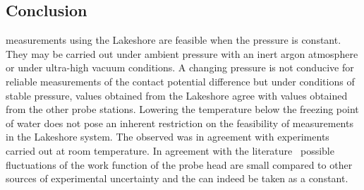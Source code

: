 \subsection{Conclusion}
\cpd{} measurements using the Lakeshore are feasible when the pressure is constant. They may be carried out under ambient pressure with an inert argon atmosphere or under ultra-high vacuum conditions. A changing pressure is not conducive for reliable measurements of the contact potential difference but under conditions of stable pressure, \cpd{} values obtained from the Lakeshore agree with values obtained from the other probe stations. Lowering the temperature below the freezing point of water does not pose an inherent restriction on the feasibility of \cpd{} measurements in the Lakeshore system. The observed \cpd{} was in agreement with experiments carried out at room temperature. In agreement with the literature~\cite{tempdepmet,tempdepmet2,tempdepmet3,tempdepmet4,tempdepmet5} possible fluctuations of the work function of the probe head are small compared to other sources of experimental uncertainty and the \wf{} can indeed be taken as a constant.


